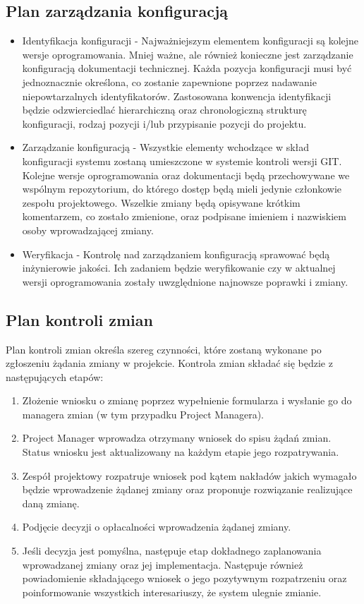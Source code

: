 \subsection*{Plan zarządzania konfiguracją}
\begin{itemize}
	\item Identyfikacja konfiguracji - Najważniejszym elementem konfiguracji są kolejne wersje oprogramowania. Mniej ważne, ale również konieczne jest zarządzanie konfiguracją dokumentacji technicznej. Każda pozycja konfiguracji musi być jednoznacznie określona, co zostanie zapewnione poprzez nadawanie niepowtarzalnych identyfikatorów. Zastosowana konwencja identyfikacji będzie odzwierciedlać hierarchiczną oraz chronologiczną strukturę konfiguracji, rodzaj pozycji i/lub przypisanie pozycji do projektu. 
	\item Zarządzanie konfiguracją - Wszystkie elementy wchodzące w skład konfiguracji systemu zostaną umieszczone w systemie kontroli wersji GIT. Kolejne wersje oprogramowania oraz dokumentacji będą przechowywane we wspólnym repozytorium, do którego dostęp będą mieli jedynie członkowie zespołu projektowego. Wszelkie zmiany będą opisywane krótkim komentarzem, co zostało zmienione, oraz podpisane imieniem i nazwiskiem osoby wprowadzającej zmiany. 
	\item Weryfikacja - Kontrolę nad zarządzaniem konfiguracją sprawować będą inżynierowie jakości. Ich zadaniem będzie weryfikowanie czy w aktualnej wersji oprogramowania zostały uwzględnione najnowsze poprawki i zmiany.
\end{itemize}

\subsection*{Plan kontroli zmian}
Plan kontroli zmian określa szereg czynności, które zostaną wykonane po zgłoszeniu żądania zmiany w projekcie. Kontrola zmian składać się będzie z następujących etapów:
\begin{enumerate}
	\item Złożenie wniosku o zmianę poprzez wypełnienie formularza i wysłanie go do managera zmian (w tym przypadku Project Managera).
	\item Project Manager wprowadza otrzymany wniosek do spisu żądań zmian. Status wniosku jest aktualizowany na każdym etapie jego rozpatrywania.
	\item Zespół projektowy rozpatruje wniosek pod kątem nakładów jakich wymagało będzie wprowadzenie żądanej zmiany oraz proponuje rozwiązanie realizujące daną zmianę.
	\item Podjęcie decyzji o opłacalności wprowadzenia żądanej zmiany.
	\item Jeśli decyzja jest pomyślna, następuje etap dokładnego zaplanowania wprowadzanej zmiany oraz jej implementacja. Następuje również powiadomienie składającego wniosek o jego pozytywnym rozpatrzeniu oraz poinformowanie wszystkich interesariuszy, że system ulegnie zmianie.
\end{enumerate}

